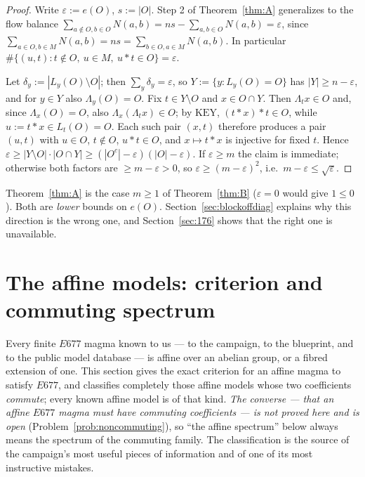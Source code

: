 \documentclass[11pt]{article}
\theoremstyle{plain}
\theoremstyle{definition}
\theoremstyle{remark}
\numberwithin{equation}{section}
\newcommand{\op}{\mathbin{*}}
\begin{document}
\begin{proof}
Write $\varepsilon := e(O)$, $s := |O|$. Step 2 of Theorem~\ref{thm:A} generalizes to the
flow balance $\sum_{a\notin O, b\in O} N(a,b) = ns - \sum_{a,b\in O} N(a,b) = \varepsilon$,
since $\sum_{a\in O, b\in M} N(a,b) = ns = \sum_{b\in O, a\in M} N(a,b)$. In particular
$\#\{(u,t) : t\notin O,\ u\in M,\ u\op t\in O\} = \varepsilon$.

Let $\delta_y := |L_y(O)\setminus O|$; then $\sum_y\delta_y = \varepsilon$, so
$Y := \{y : L_y(O) = O\}$ has $|Y|\ge n-\varepsilon$, and for $y\in Y$ also
$\Lambda_y(O) = O$. Fix $t\in Y\setminus O$ and $x\in O\cap Y$. Then $\Lambda_t x\in O$ and,
since $\Lambda_x(O) = O$, also $\Lambda_x(\Lambda_t x)\in O$; by $\mathrm{KEY}$,
$(t\op x)\op t\in O$, while $u := t\op x \in L_t(O) = O$. Each such pair $(x,t)$ therefore
produces a pair $(u,t)$ with $u\in O$, $t\notin O$, $u\op t\in O$, and $x\mapsto t\op x$ is
injective for fixed $t$. Hence
$\varepsilon \ge |Y\setminus O|\cdot|O\cap Y| \ge (|O^{c}|-\varepsilon)(|O|-\varepsilon)$.
If $\varepsilon\ge m$ the claim is immediate; otherwise both factors are $\ge m-\varepsilon>0$,
so $\varepsilon\ge(m-\varepsilon)^2$, i.e.\ $m-\varepsilon\le\sqrt\varepsilon$.
\end{proof}

Theorem~\ref{thm:A} is the case $m\ge 1$ of Theorem~\ref{thm:B} ($\varepsilon = 0$ would give
$1\le 0$). Both are \emph{lower} bounds on $e(O)$. Section~\ref{sec:blockoffdiag} explains why
this direction is the wrong one, and Section~\ref{sec:176} shows that the right one is
unavailable.

\section{The affine models: criterion and commuting spectrum}\label{sec:affine}

Every finite $E677$ magma known to us --- to the campaign, to the blueprint, and to the
public model database \cite{icarm} --- is affine over an abelian group, or a fibred extension
of one. This section gives the exact criterion for an affine magma to satisfy $E677$, and
classifies completely those affine models whose two coefficients \emph{commute}; every known
affine model is of that kind. \emph{The converse --- that an affine $E677$ magma must have
commuting coefficients --- is not proved here and is open} (Problem~\ref{prob:noncommuting}),
so ``the affine spectrum'' below always means the spectrum of the commuting family. The
classification is the source of the campaign's most useful pieces of information and of one
of its most instructive mistakes.
\end{document}
